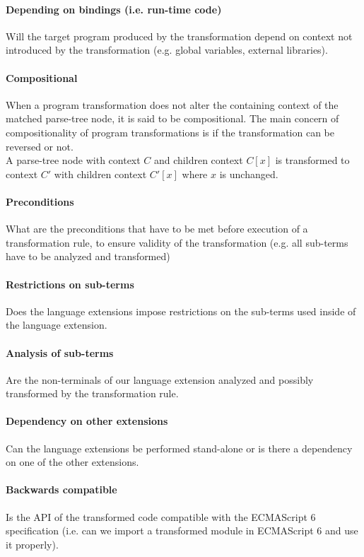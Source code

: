 \paragraph{Depending on bindings (i.e. run-time code)}
Will the target program produced by the transformation depend on context not introduced by the transformation (e.g. global variables, external libraries).

\paragraph{Compositional}
When a program transformation does not alter the containing context of the matched parse-tree node, it is said to be compositional. The main concern of compositionality of program transformations is if the transformation can be reversed or not.
\\ 
A parse-tree node with context $C$ and children context $C[x]$ is transformed to context $C'$ with children context $C'[x]$ where $x$ is unchanged.

\paragraph{Preconditions}
What are the preconditions that have to be met before execution of a transformation rule, to ensure validity of the transformation (e.g. all sub-terms have to be analyzed and transformed)

\paragraph{Restrictions on sub-terms}
Does the language extensions impose restrictions on the sub-terms used inside of the language extension. 

\paragraph{Analysis of sub-terms}
Are the non-terminals of our language extension analyzed and possibly transformed by the transformation rule.

\paragraph{Dependency on other extensions}
Can the language extensions be performed stand-alone or is there a dependency on one of the other extensions.

\paragraph{Backwards compatible}
Is the API of the transformed code compatible with the ECMAScript 6 specification (i.e. can we import a transformed module in ECMAScript 6 and use it properly).

